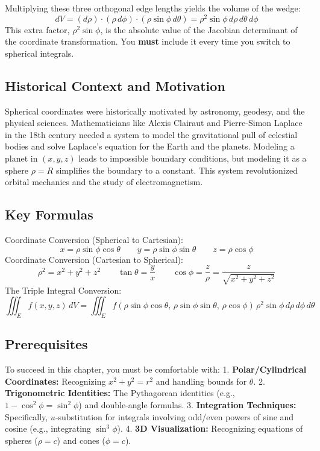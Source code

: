 \documentclass[12pt]{article}
\begin{document}
Multiplying these three orthogonal edge lengths yields the volume of the wedge:
\[ dV = (d\rho) \cdot (\rho \, d\phi) \cdot (\rho \sin\phi \, d\theta) = \rho^2 \sin\phi \, d\rho \, d\theta \, d\phi \]
This extra factor, $\rho^2 \sin\phi$, is the absolute value of the Jacobian determinant of the coordinate transformation. You \textbf{must} include it every time you switch to spherical integrals.

\subsection{Historical Context and Motivation}
Spherical coordinates were historically motivated by astronomy, geodesy, and the physical sciences. Mathematicians like Alexis Clairaut and Pierre-Simon Laplace in the 18th century needed a system to model the gravitational pull of celestial bodies and solve Laplace's equation for the Earth and the planets. Modeling a planet in $(x, y, z)$ leads to impossible boundary conditions, but modeling it as a sphere $\rho = R$ simplifies the boundary to a constant. This system revolutionized orbital mechanics and the study of electromagnetism.

\subsection{Key Formulas}
Coordinate Conversion (Spherical to Cartesian):
\[ x = \rho \sin\phi \cos\theta \quad \quad y = \rho \sin\phi \sin\theta \quad \quad z = \rho \cos\phi \]
Coordinate Conversion (Cartesian to Spherical):
\[ \rho^2 = x^2 + y^2 + z^2 \quad \quad \tan\theta = \frac{y}{x} \quad \quad \cos\phi = \frac{z}{\rho} = \frac{z}{\sqrt{x^2+y^2+z^2}} \]
The Triple Integral Conversion:
\[ \iiint_E f(x,y,z) \, dV = \iiint_E f(\rho \sin\phi \cos\theta, \, \rho \sin\phi \sin\theta, \, \rho \cos\phi) \, \rho^2 \sin\phi \, d\rho \, d\phi \, d\theta \]

\subsection{Prerequisites}
To succeed in this chapter, you must be comfortable with:
1. \textbf{Polar/Cylindrical Coordinates:} Recognizing $x^2 + y^2 = r^2$ and handling bounds for $\theta$.
2. \textbf{Trigonometric Identities:} The Pythagorean identities (e.g., $1 - \cos^2\phi = \sin^2\phi$) and double-angle formulas.
3. \textbf{Integration Techniques:} Specifically, $u$-substitution for integrals involving odd/even powers of sine and cosine (e.g., integrating $\sin^3\phi$).
4. \textbf{3D Visualization:} Recognizing equations of spheres ($\rho = c$) and cones ($\phi = c$).
\end{document}
